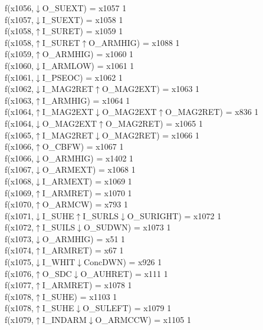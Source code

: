 f(x1056,$\downarrow$O\_SUEXT) = x1057 {1} \\
f(x1057,$\downarrow$I\_SUEXT) = x1058 {1} \\
f(x1058,$\uparrow$I\_SURET) = x1059 {1} \\
f(x1058,$\uparrow$I\_SURET$\uparrow$O\_ARMHIG) = x1088 {1} \\
f(x1059,$\uparrow$O\_ARMHIG) = x1060 {1} \\
f(x1060,$\downarrow$I\_ARMLOW) = x1061 {1} \\
f(x1061,$\downarrow$I\_PSEOC) = x1062 {1} \\
f(x1062,$\downarrow$I\_MAG2RET$\uparrow$O\_MAG2EXT) = x1063 {1} \\
f(x1063,$\uparrow$I\_ARMHIG) = x1064 {1} \\
f(x1064,$\uparrow$I\_MAG2EXT$\downarrow$O\_MAG2EXT$\uparrow$O\_MAG2RET) = x836 {1} \\
f(x1064,$\downarrow$O\_MAG2EXT$\uparrow$O\_MAG2RET) = x1065 {1} \\
f(x1065,$\uparrow$I\_MAG2RET$\downarrow$O\_MAG2RET) = x1066 {1} \\
f(x1066,$\uparrow$O\_CBFW) = x1067 {1} \\
f(x1066,$\downarrow$O\_ARMHIG) = x1402 {1} \\
f(x1067,$\downarrow$O\_ARMEXT) = x1068 {1} \\
f(x1068,$\downarrow$I\_ARMEXT) = x1069 {1} \\
f(x1069,$\uparrow$I\_ARMRET) = x1070 {1} \\
f(x1070,$\uparrow$O\_ARMCW) = x793 {1} \\
f(x1071,$\downarrow$I\_SUHE$\uparrow$I\_SURLS$\downarrow$O\_SURIGHT) = x1072 {1} \\
f(x1072,$\uparrow$I\_SUILS$\downarrow$O\_SUDWN) = x1073 {1} \\
f(x1073,$\downarrow$O\_ARMHIG) = x51 {1} \\
f(x1074,$\uparrow$I\_ARMRET) = x67 {1} \\
f(x1075,$\downarrow$I\_WHIT$\downarrow$ConcDWN) = x926 {1} \\
f(x1076,$\uparrow$O\_SDC$\downarrow$O\_AUHRET) = x111 {1} \\
f(x1077,$\uparrow$I\_ARMRET) = x1078 {1} \\
f(x1078,$\uparrow$I\_SUHE) = x1103 {1} \\
f(x1078,$\uparrow$I\_SUHE$\downarrow$O\_SULEFT) = x1079 {1} \\
f(x1079,$\uparrow$I\_INDARM$\downarrow$O\_ARMCCW) = x1105 {1} \\
